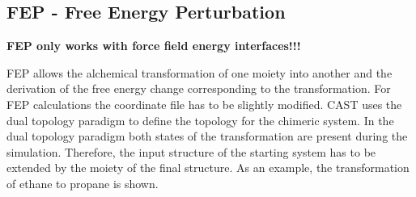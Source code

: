 \documentclass[10pt,a4paper]{article} %
\begin{document}
	\subsection{FEP - Free Energy Perturbation}
	
\textbf{FEP only works with force field energy interfaces!!!}
	
	\acf{FEP} allows the alchemical transformation of one moiety into another and the derivation of the free energy change corresponding to the transformation. For \ac{FEP} calculations the coordinate file has to be slightly modified. \ac{CAST} uses the dual topology paradigm to define the topology for the chimeric system. In the dual topology paradigm both states of the transformation are present during the simulation. Therefore, the input structure of the starting system has to be extended by the moiety of the final structure. As an example, the transformation of ethane to propane is shown. \\
\end{document}
